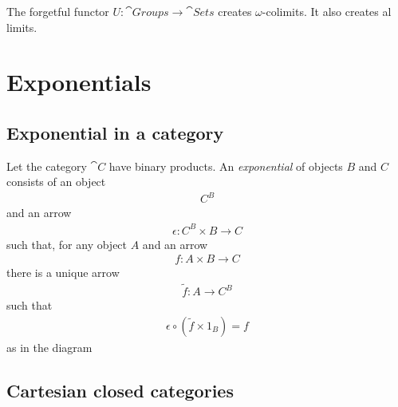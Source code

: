 \documentclass{article}
\begin{document}
\begin{proposition}
    The forgetful functor $U:\cat{Groups}\to\cat{Sets}$ creates $\omega$-colimits.
    It also creates al limits.
\end{proposition}

\section{Exponentials}

\subsection{Exponential in a category}

\begin{definition}[Awodey p. 121]
    Let the category $\cat C$ have binary products. An \emph{exponential}
    of objects $B$ and $C$ consists of an object
    \begin{align*}
        C^B
    \end{align*} 
    and an arrow
    \begin{align*}
        \epsilon:C^B\times B \to C
    \end{align*}
    such that, for any object $A$ and an arrow
    \begin{align*}
        f:A\times B\to C
    \end{align*}
    there is a unique arrow
    \begin{align*}
        \tilde f:A\to C^B
    \end{align*}
    such that
    \begin{align*}
        \epsilon \circ (\tilde f\times 1_B) = f
    \end{align*}
    as in the diagram
    \begin{center}
    \end{center}
\end{definition}

\subsection{Cartesian closed categories}
\end{document}
